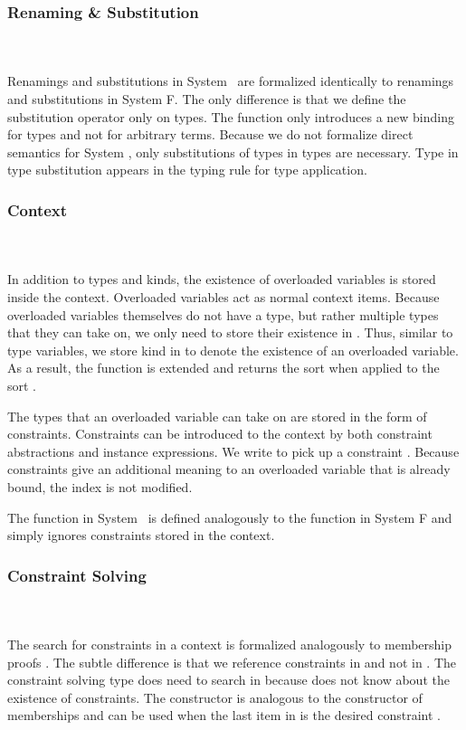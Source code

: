 \subsubsection{Renaming \& Substitution}\hfill\\\\
Renamings and substitutions in System \Fo\ are formalized identically to renamings and substitutions in System F. 
The only difference is that we define the substitution operator only on types. 
\Fosubs
The  function only introduces a new binding for types and not for arbitrary terms.
Because we do not formalize direct semantics for System \Fo, only substitutions of types in types are necessary. Type in type substitution appears in the typing rule for type application.

\subsubsection{Context}\hfill\\\\
In addition to types and kinds, the existence of overloaded variables is stored inside the context. Overloaded variables act as normal context items. 
Because overloaded variables themselves do not have a type, but rather multiple types that they can take on, we only need to store their existence in . Thus, similar to type variables, we store kind  in  to denote the existence of an overloaded variable. As a result, the  function is extended and returns the sort  when applied to the sort .

\noindent The types that an overloaded variable can take on are stored in the form of constraints. Constraints can be introduced to the context by both constraint abstractions and instance expressions.
\FoCtx
We write    to pick up a constraint . 
Because constraints give an additional meaning to an overloaded variable that is already bound, the index  is not modified. 

\noindent The  function in System \Fo\ is defined analogously to the  function in System F and simply ignores constraints stored in the context.

\subsubsection{Constraint Solving}\hfill\\\\
The search for constraints in a context is formalized analogously to membership proofs   . The subtle difference is that we reference constraints in  and not in . The constraint solving type does need to search in  because  does not know about the existence of constraints.
\FoCstrSolve
The  constructor is analogous to the  constructor of memberships and can be used when the last item in  is the desired constraint .

